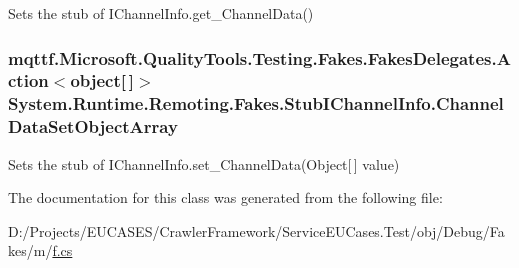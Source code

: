 Sets the stub of I\-Channel\-Info.\-get\-\_\-\-Channel\-Data()

\hypertarget{class_system_1_1_runtime_1_1_remoting_1_1_fakes_1_1_stub_i_channel_info_a073a70f5832bbec3554f0f8711454d96}{
\subsubsection[{Channel\-Data\-Set\-Object\-Array}]{\setlength{\rightskip}{0pt plus 5cm}mqttf.\-Microsoft.\-Quality\-Tools.\-Testing.\-Fakes.\-Fakes\-Delegates.\-Action$<$object\mbox{[}$\,$\mbox{]}$>$ System.\-Runtime.\-Remoting.\-Fakes.\-Stub\-I\-Channel\-Info.\-Channel\-Data\-Set\-Object\-Array}}\label{class_system_1_1_runtime_1_1_remoting_1_1_fakes_1_1_stub_i_channel_info_a073a70f5832bbec3554f0f8711454d96}


Sets the stub of I\-Channel\-Info.\-set\-\_\-\-Channel\-Data(\-Object\mbox{[}$\,$\mbox{]} value)



The documentation for this class was generated from the following file\-:\begin{DoxyCompactItemize}
\item 
D\-:/\-Projects/\-E\-U\-C\-A\-S\-E\-S/\-Crawler\-Framework/\-Service\-E\-U\-Cases.\-Test/obj/\-Debug/\-Fakes/m/\hyperlink{m_2f_8cs}{f.\-cs}\end{DoxyCompactItemize}
